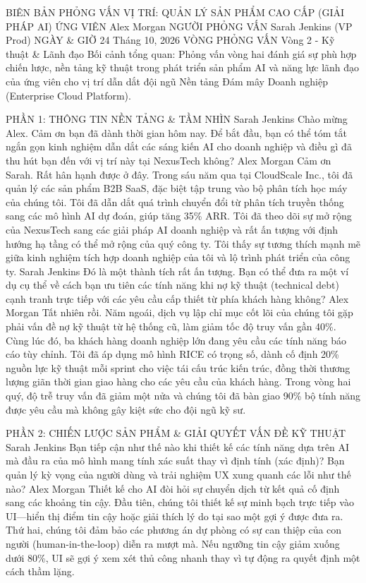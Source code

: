 BIÊN BẢN PHỎNG VẤN
VỊ TRÍ: QUẢN LÝ SẢN PHẨM CAO CẤP (GIẢI PHÁP AI)
ỨNG VIÊN
Alex Morgan
NGƯỜI PHỎNG VẤN
Sarah Jenkins (VP Prod)
NGÀY \& GIỜ
24 Tháng 10, 2026
VÒNG PHỎNG VẤN
Vòng 2 - Kỹ thuật \&
Lãnh đạo
Bối cảnh tổng quan: Phỏng vấn vòng hai đánh giá sự phù hợp chiến lược, nền tảng kỹ thuật trong phát triển sản phẩm AI và năng lực lãnh đạo của ứng viên cho vị trí dẫn dắt đội ngũ Nền tảng Đám mây Doanh nghiệp (Enterprise Cloud Platform).

PHẦN 1: THÔNG TIN NỀN TẢNG \& TẦM NHÌN
Sarah Jenkins
Chào mừng Alex. Cảm ơn bạn đã dành thời gian hôm nay. Để bắt đầu, bạn có thể tóm tắt ngắn gọn kinh nghiệm dẫn dắt các sáng kiến AI cho doanh nghiệp và điều gì đã thu hút bạn đến với vị trí này tại NexusTech không?
Alex Morgan
Cảm ơn Sarah. Rất hân hạnh được ở đây. Trong sáu năm qua tại CloudScale Inc., tôi đã quản lý các sản phẩm B2B SaaS, đặc biệt tập trung vào bộ phân tích học máy của chúng tôi. Tôi đã dẫn dắt quá trình chuyển đổi từ phân tích truyền thống sang các mô hình AI dự đoán, giúp tăng 35\% ARR. Tôi đã theo dõi sự mở rộng của NexusTech sang các giải pháp AI doanh nghiệp và rất ấn tượng với định hướng hạ tầng có thể mở rộng của quý công ty. Tôi thấy sự tương thích mạnh mẽ giữa kinh nghiệm tích hợp doanh nghiệp của tôi và lộ trình phát triển của công ty.
Sarah Jenkins
Đó là một thành tích rất ấn tượng. Bạn có thể đưa ra một ví dụ cụ thể về cách bạn ưu tiên các tính năng khi nợ kỹ thuật (technical debt) cạnh tranh trực tiếp với các yêu cầu cấp thiết từ phía khách hàng không?
Alex Morgan
Tất nhiên rồi. Năm ngoái, dịch vụ lập chỉ mục cốt lõi của chúng tôi gặp phải vấn đề nợ kỹ thuật từ hệ thống cũ, làm giảm tốc độ truy vấn gần 40\%. Cùng lúc đó, ba khách hàng doanh nghiệp lớn đang yêu cầu các tính năng báo cáo tùy chỉnh. Tôi đã áp dụng mô hình RICE có trọng số, dành cố định 20\% nguồn lực kỹ thuật mỗi sprint cho việc tái cấu trúc kiến trúc, đồng thời thương lượng giãn thời gian giao hàng cho các yêu cầu của khách hàng. Trong vòng hai quý, độ trễ truy vấn đã giảm một nửa và chúng tôi đã bàn giao 90\% bộ tính năng được yêu cầu mà không gây kiệt sức cho đội ngũ kỹ sư.

PHẦN 2: CHIẾN LƯỢC SẢN PHẨM \& GIẢI QUYẾT VẤN ĐỀ KỸ THUẬT
Sarah Jenkins
Bạn tiếp cận như thế nào khi thiết kế các tính năng dựa trên AI mà đầu ra của mô hình mang tính xác suất thay vì định tính (xác định)? Bạn quản lý kỳ vọng của người dùng và trải nghiệm UX xung quanh các lỗi như thế nào?
Alex Morgan
Thiết kế cho AI đòi hỏi sự chuyển dịch từ kết quả cố định sang các khoảng tin cậy. Đầu tiên, chúng tôi thiết kế sự minh bạch trực tiếp vào UI—hiển thị điểm tin cậy hoặc giải thích lý do tại sao một gợi ý được đưa ra. Thứ hai, chúng tôi đảm bảo các phương án dự phòng có sự can thiệp của con người (human-in-the-loop) diễn ra mượt mà. Nếu ngưỡng tin cậy giảm xuống dưới 80\%, UI sẽ gợi ý xem xét thủ công nhanh thay vì tự động ra quyết định một cách thầm lặng.


